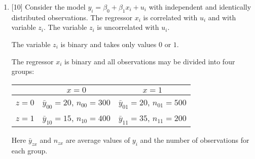 \documentclass[12pt]{article}
\begin{document}
\begin{enumerate}
    
    

    \item {[10]} Consider the model $y_i = \beta_0 + \beta_1 x_i + u_i$ with independent and identically distributed observations.
    The regressor $x_i$ is correlated with $u_i$ and with variable $z_i$. 
    The variable $z_i$ is uncorrelated with $u_i$. 

    The variable $z_i$ is binary and takes only values $0$ or $1$. 

    
    The regressor $x_i$ is binary and all observations may be divided into four groups:
        
        \begin{tabular}{lcc}
            \toprule
             & $x = 0$  & $x = 1$ \\
             \midrule
            $z = 0$ & $\bar y_{00} = 20$, $n_{00} =  300$ & $\bar y_{01} = 20$, $n_{01} =  500$  \\
            $z = 1$ & $\bar y_{10} = 15$, $n_{10} =  400$  & $\bar y_{11} = 35$, $n_{11} =  200$  \\
          \bottomrule
        \end{tabular}

        Here $\bar y_{zx}$ and $n_{zx}$ are average values of $y_i$ and the number of observations for each group.

     
        


\end{enumerate}
\end{document}
